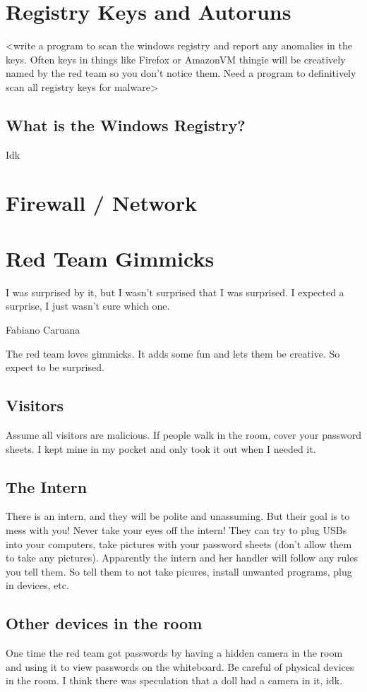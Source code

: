 \documentclass{article}
\begin{document}
\section{Registry Keys and Autoruns}
<write a program to scan the windows registry and report any anomalies in the keys.
Often keys in things like Firefox or AmazonVM thingie will be creatively named by the red team
so you don't notice them. Need a program to definitively scan all registry keys for malware>

\subsection{What is the Windows Registry?}
Idk

\section{Firewall / Network}

\section{Red Team Gimmicks}
\epigraph{I was surprised by it, but I wasn’t surprised that I was surprised. I expected a surprise, I just wasn’t sure which one.}{Fabiano Caruana}

The red team loves gimmicks. It adds some fun and lets them be creative. So expect to be surprised.

\subsection{Visitors}
Assume all visitors are malicious.
If people walk in the room, cover your password sheets. I kept mine in my pocket and only took it out when I needed it. 

\subsection{The Intern}
There is an intern, and they will be polite and unassuming. But their goal is to mess with you! Never take your eyes off the intern!
They can try to plug USBs into your computers, take pictures with your password sheets (don't allow them to take any pictures).
Apparently the intern and her handler will follow any rules you tell them. So tell them to not take picures, install unwanted programs, plug in devices, etc.

\subsection{Other devices in the room}
One time the red team got passwords by having a hidden camera in the room and using it to view passwords on the whiteboard. 
Be careful of physical devices in the room. I think there was speculation that a doll had a camera in it, idk.
\end{document}
